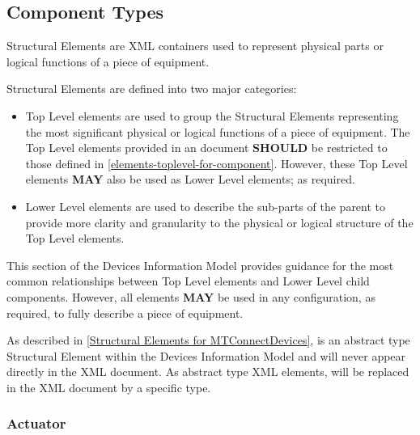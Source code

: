 \subsection{Component Types} \label{sec:ComponentTypes}


 \glspl{Structural Element} are XML containers used to represent physical parts or logical functions of a piece of equipment.

 \glspl{Structural Element} are defined into two major categories:

\begin{itemize}

\item \gls{Top Level}  elements are used to group the \glspl{Structural Element} representing the most significant physical or logical functions of a piece of equipment.  The \gls{Top Level}  elements provided in an  document \textbf{SHOULD} be restricted to those defined in \ref{elements-toplevel-for-component}.  However, these \gls{Top Level}  elements \textbf{MAY} also be used as \gls{Lower Level}  elements; as required.

\item \gls{Lower Level}  elements are used to describe the sub-parts of the parent  to provide more clarity and granularity to the physical or logical structure of the \gls{Top Level}  elements.
\end{itemize}

This section of the \gls{Devices Information Model} provides guidance for the most common relationships between \gls{Top Level}  elements and \gls{Lower Level} child components.  However, all  elements \textbf{MAY} be used in any configuration, as required, to fully describe a piece of equipment.

As described in \ref{Structural Elements for MTConnectDevices},  is an abstract type \gls{Structural Element} within the \gls{Devices Information Model} and will never appear directly in the  XML document.  As abstract type XML elements,  will be replaced in the XML document by a specific  type.


\subsubsection{Actuator}
  \label{sec:Actuator}



